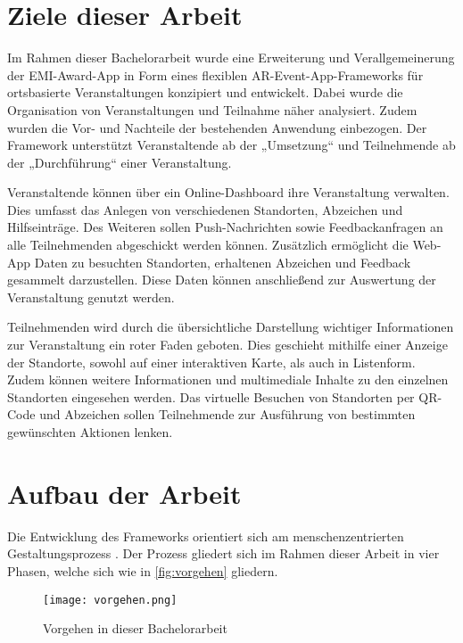 \section{Ziele dieser Arbeit} \label{sec:goals}

Im Rahmen dieser Bachelorarbeit wurde eine Erweiterung und Verallgemeinerung der
EMI-Award-App in Form eines flexiblen AR-Event-App-Frameworks für ortsbasierte
Veranstaltungen konzipiert und entwickelt. Dabei wurde die Organisation von
Veranstaltungen und Teilnahme näher analysiert. Zudem wurden die Vor- und
Nachteile der bestehenden Anwendung einbezogen. Der Framework unterstützt
Veranstaltende ab der „Umsetzung“ und Teilnehmende ab der „Durchführung“ einer Veranstaltung.

Veranstaltende können über ein Online-Dashboard ihre Veranstaltung verwalten.
Dies umfasst das Anlegen von verschiedenen Standorten, Abzeichen und
Hilfseinträge. Des Weiteren sollen Push-Nachrichten sowie Feedbackanfragen an
alle Teilnehmenden abgeschickt werden können. Zusätzlich ermöglicht die Web-App
Daten zu besuchten Standorten, erhaltenen Abzeichen und Feedback gesammelt
darzustellen. Diese Daten können anschließend zur Auswertung der Veranstaltung
genutzt werden.

Teilnehmenden wird durch die übersichtliche Darstellung wichtiger Informationen
zur Veranstaltung ein roter Faden geboten. Dies geschieht mithilfe einer
Anzeige der Standorte, sowohl auf einer interaktiven Karte, als auch in
Listenform. Zudem können weitere Informationen und multimediale Inhalte zu den
einzelnen Standorten eingesehen werden. Das virtuelle Besuchen von Standorten
per QR-Code und Abzeichen sollen Teilnehmende zur Ausführung von bestimmten
gewünschten Aktionen lenken.

\section{Aufbau der Arbeit}

Die Entwicklung des Frameworks orientiert sich am menschenzentrierten
Gestaltungsprozess . Der Prozess gliedert sich im Rahmen
dieser Arbeit in vier Phasen, welche sich wie in \autoref{fig:vorgehen}
gliedern.


\begin{figure}[htpb]
    \centering
    \texttt{[image: vorgehen.png]}
    \caption{Vorgehen in dieser Bachelorarbeit }
    \label{fig:vorgehen}
\end{figure}

